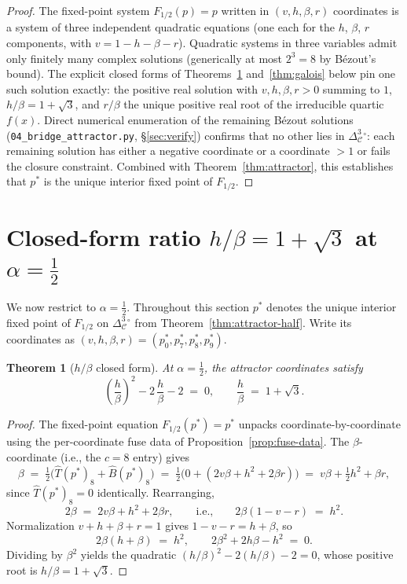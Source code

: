 \documentclass[11pt,reqno]{amsart}
\theoremstyle{plain}
\newtheorem{theorem}{Theorem}
\theoremstyle{definition}
\theoremstyle{remark}
\newcommand{\Cfour}{\mathcal{C}}
\newcommand{\Tfuse}{\widehat{T}}
\newcommand{\Bfuse}{\widehat{B}}
\begin{document}
\begin{proof}
The fixed-point system $F_{1/2}(p) = p$ written in
$(v, h, \beta, r)$ coordinates is a system of three independent
quadratic equations (one each for the $h$, $\beta$, $r$
components, with $v = 1 - h - \beta - r$). Quadratic systems in
three variables admit only finitely many complex solutions
(generically at most $2^{3} = 8$ by B\'ezout's bound). The
explicit closed forms of Theorems~\ref{thm:hbr-ratio}
and~\ref{thm:galois} below pin one such solution exactly: the
positive real solution with $v, h, \beta, r > 0$ summing to $1$,
$h/\beta = 1+\sqrt{3}$, and $r/\beta$ the unique positive real
root of the irreducible quartic $f(x)$. Direct numerical
enumeration of the remaining B\'ezout solutions
(\texttt{04\_bridge\_attractor.py}, \S\ref{sec:verify}) confirms
that no other lies in $\Delta^{3}_{\Cfour}^{\circ}$:
each remaining solution has either a negative coordinate or a
coordinate $> 1$ or fails the closure constraint.
Combined with Theorem~\ref{thm:attractor}, this establishes
that $p^*$ is the unique interior fixed point of $F_{1/2}$.
\end{proof}

\section{Closed-form ratio $h/\beta = 1+\sqrt{3}$ at $\alpha = \tfrac12$}\label{sec:hbr}

We now restrict to $\alpha = \tfrac12$. Throughout this section
$p^*$ denotes the unique interior fixed point of $F_{1/2}$ on
$\Delta^{3}_{\Cfour}^{\circ}$ from Theorem~\ref{thm:attractor-half}.
Write its coordinates as
$(v, h, \beta, r) = (p^*_{0}, p^*_{7}, p^*_{8}, p^*_{9})$.

\begin{theorem}[$h/\beta$ closed form]\label{thm:hbr-ratio}
At $\alpha = \tfrac12$, the attractor coordinates satisfy
\[
  \left(\frac{h}{\beta}\right)^{2} - 2\,\frac{h}{\beta} - 2 \;=\; 0,
  \qquad \frac{h}{\beta} \;=\; 1 + \sqrt{3}.
\]
\end{theorem}

\begin{proof}
The fixed-point equation $F_{1/2}(p^*) = p^*$ unpacks
coordinate-by-coordinate using the per-coordinate fuse data of
Proposition~\ref{prop:fuse-data}. The
$\beta$-coordinate (i.e., the $c = 8$ entry) gives
\[
  \beta \;=\; \tfrac12\bigl(\Tfuse(p^*)_{8} + \Bfuse(p^*)_{8}\bigr)
        \;=\; \tfrac12\bigl(0 + (2v\beta + h^{2} + 2\beta r)\bigr)
        \;=\; v\beta + \tfrac12 h^{2} + \beta r,
\]
since $\Tfuse(p^*)_{8} = 0$ identically. Rearranging,
\[
  2\beta \;=\; 2v\beta + h^{2} + 2\beta r,
  \qquad\text{i.e.,}\qquad
  2\beta(1 - v - r) \;=\; h^{2}.
\]
Normalization $v + h + \beta + r = 1$ gives $1 - v - r = h + \beta$, so
\[
  2\beta(h + \beta) \;=\; h^{2},
  \qquad
  2\beta^{2} + 2 h\beta - h^{2} \;=\; 0.
\]
Dividing by $\beta^{2}$ yields the quadratic
$(h/\beta)^{2} - 2(h/\beta) - 2 = 0$, whose positive root is
$h/\beta = 1 + \sqrt{3}$.
\end{proof}
\end{document}
